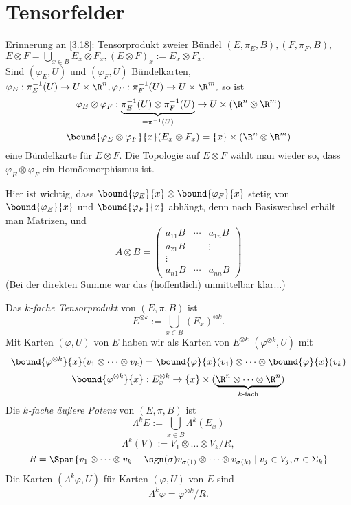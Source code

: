 \chapter{Tensorfelder}\label{4}
\lecture

\begin{rem}
	Erinnerung an \ref{3.18}: Tensorprodukt zweier Bündel $ (E, \pi_E, B), (F, \pi_F,B)$, $E \otimes F = \bigcup_{x \in B} E_x \otimes F_x, (E \otimes F)_x := E_x \otimes F_x. $\\
	Sind $ (\varphi_E,U) $ und $(\varphi_F,U)$ Bündelkarten, $ \varphi_E: \pi_E^{-1}(U) \to U \times \R^n, \varphi_F: \pi_F^{-1}(U) \to U \times \R^m, $ so ist
	\[ \varphi_E \otimes \varphi_F: \underbrace{\pi_E^{-1}(U) \otimes \pi_F^{-1}(U)}_{= \pi^{-1}(U)} \to U \times (\R^n \otimes \R^m) \]
	\[ \bound{\varphi_E \otimes \varphi_F}{x}(E_x \otimes F_x) = \{x\} \times (\R^n \otimes \R^m) \]
	eine Bündelkarte für $E \otimes F$. Die Topologie auf $E \otimes F$ wählt man wieder so, dass $\varphi_E \otimes \varphi_F$ ein Homöomorphismus ist.
\end{rem}

\begin{rem*}
	Hier ist wichtig, dass $ \bound{\varphi_E}{x} \otimes  \bound{\varphi_F}{x} $ stetig von $ \bound{\varphi_E}{x} $ und $ \bound{\varphi_F}{x} $ abhängt, denn nach Basiswechsel erhält man Matrizen, und
	\[ A \otimes B = \begin{pmatrix}
		a_{11}B & \cdots & a_{1n}B\\
		a_{21}B & 		& \vdots\\
		\vdots &	&\\
		a_{n1}B & \cdots & a_{nn}B
	\end{pmatrix} \]
	(Bei der direkten Summe war das (hoffentlich) unmittelbar klar...)
\end{rem*}

\begin{defn}
	Das \emph{$k$-fache Tensorprodukt} von $ (E,\pi,B) $ ist
	\[ E^{\otimes k} := \bigcup_{x \in B} (E_x)^{\otimes k}. \]
	Mit Karten $(\varphi,U)$ von $E$ haben wir als Karten von $E^{\otimes k}$ $(\varphi^{\otimes k},U)$ mit
	\[ \bound{\varphi^{\otimes k}}{x} (v_1 \otimes \dots \otimes v_k) = \bound{\varphi}{x}(v_1) \otimes \dots \otimes \bound{\varphi}{x}(v_k) \]
	\[ \bound{\varphi^{\otimes k}}{x}: E_x^{\otimes k} \to \{x\} \times (\underbrace{\R^n \otimes \dots \otimes \R^n}_{k\text{-fach}}) \]
	Die \emph{$k$-fache äußere Potenz} von $(E,\pi,B)$ ist
	\[ \Lambda^k E:= \bigcup_{x \in B} \Lambda^k(E_x) \]
	\[ \Lambda^k(V) := V_1 \otimes \dots \otimes V_k / R, \]
	\[ R = \Span\{v_1 \otimes \dots \otimes v_k - \sgn(\sigma) v_{\sigma(1)} \otimes \dots \otimes v_{\sigma(k)} \mid v_j \in V_j, \sigma \in \Sigma_k\} \]
	Die Karten $(\Lambda^k\varphi,U)$ für Karten $(\varphi,U)$ von $E$ sind
	\[ \Lambda^k\varphi = \varphi^{\otimes k}/R. \]
\end{defn}

